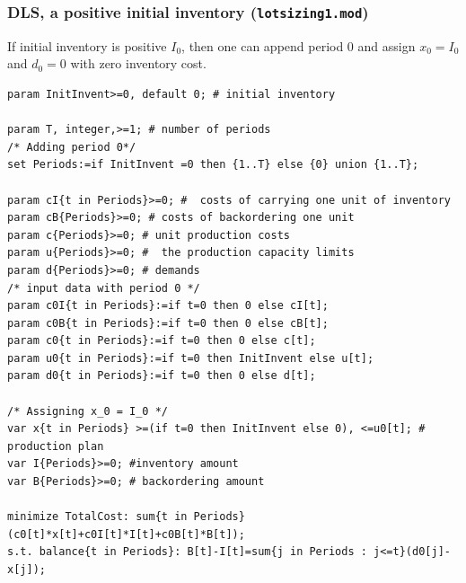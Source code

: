 \documentclass[landscape]{beamer}
\begin{document}
\begin{frame}[fragile]
  \frametitle{DLS, a positive initial inventory (\texttt{lotsizing1.mod})}   
\begin{small} 
  If initial inventory  is positive $I_0$, then one can append period 0 and assign $x_0 = I_0$
   and $d_0 = 0$  with zero inventory cost.
\begin{tiny}
\begin{verbatim}
param InitInvent>=0, default 0; # initial inventory

param T, integer,>=1; # number of periods 
/* Adding period 0*/
set Periods:=if InitInvent =0 then {1..T} else {0} union {1..T};

param cI{t in Periods}>=0; #  costs of carrying one unit of inventory 
param cB{Periods}>=0; # costs of backordering one unit 
param c{Periods}>=0; # unit production costs
param u{Periods}>=0; #  the production capacity limits
param d{Periods}>=0; # demands  
/* input data with period 0 */
param c0I{t in Periods}:=if t=0 then 0 else cI[t];
param c0B{t in Periods}:=if t=0 then 0 else cB[t];
param c0{t in Periods}:=if t=0 then 0 else c[t];
param u0{t in Periods}:=if t=0 then InitInvent else u[t];
param d0{t in Periods}:=if t=0 then 0 else d[t];

/* Assigning x_0 = I_0 */
var x{t in Periods} >=(if t=0 then InitInvent else 0), <=u0[t]; # production plan
var I{Periods}>=0; #inventory amount 
var B{Periods}>=0; # backordering amount

minimize TotalCost: sum{t in Periods} (c0[t]*x[t]+c0I[t]*I[t]+c0B[t]*B[t]);
s.t. balance{t in Periods}: B[t]-I[t]=sum{j in Periods : j<=t}(d0[j]-x[j]);
\end{verbatim}
\end{tiny}
\end{small}
\end{frame}
\end{document}
